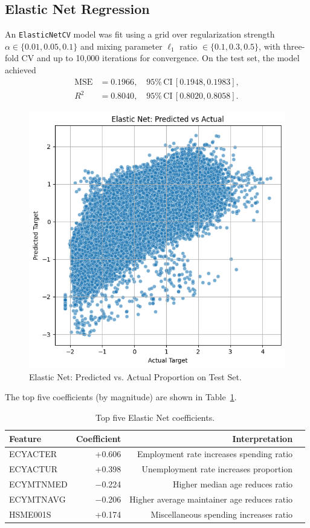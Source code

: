 \documentclass{article}
\begin{document}
\subsection{Elastic Net Regression}
An \texttt{ElasticNetCV} model was fit using a grid over regularization strength $\alpha \in\{0.01,0.05,0.1\}$ and mixing parameter $\ell_1$ ratio $\in\{0.1,0.3,0.5\}$, with three-fold CV and up to 10{,}000 iterations for convergence. On the test set, the model achieved
\begin{align*}
  \mathrm{MSE} &= 0.1966, \quad 95\%\,\mathrm{CI}\,[0.1948,0.1983], \\
  R^2 &= 0.8040, \quad 95\%\,\mathrm{CI}\,[0.8020,0.8058].
\end{align*}

\begin{figure}[ht]
  \centering
  \includegraphics[width=0.75\linewidth]{figures/elastic_net_scatter.png}
  \caption{Elastic Net: Predicted vs. Actual Proportion on Test Set.}
  \label{fig:en_scatter}
\end{figure}

The top five coefficients (by magnitude) are shown in Table~\ref{tab:en_coefs}.
\begin{table}[ht]
  \centering
  \begin{tabular}{lrrp{5cm}}
    \toprule
    Feature & Coefficient & Interpretation \\
    \midrule
    ECYACTER     & +0.606 & Employment rate increases spending ratio \\
    ECYACTUR     & +0.398 & Unemployment rate increases proportion \\
    ECYMTNMED    & $-$0.224 & Higher median age reduces ratio \\
    ECYMTNAVG    & $-$0.206 & Higher average maintainer age reduces ratio \\
    HSME001S     & +0.174 & Miscellaneous spending increases ratio \\
    \bottomrule
  \end{tabular}
  \caption{Top five Elastic Net coefficients.}
  \label{tab:en_coefs}
\end{table}
\end{document}
